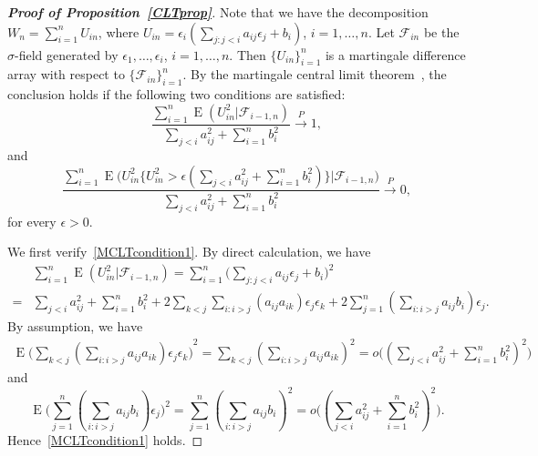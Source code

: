 \documentclass[3p]{elsarticle}
\DeclareMathOperator{\myE}{E}
\theoremstyle{plain}
\theoremstyle{definition}
\theoremstyle{remark}
\begin{document}
 \begin{proof}[\textbf{Proof of Proposition~\ref{CLTprop}}]
     Note that we have the decomposition $W_n=\sum_{i=1}^n U_{in}$, where $U_{in} =\epsilon_i (\sum_{j:j<i} a_{ij}\epsilon_j+b_i )$, $i=1,\ldots,n$.
    Let $\mathcal{F}_{in}$ be the $\sigma$-field generated by $\epsilon_1,\ldots,\epsilon_i$, $i=1,\ldots, n$.
     Then $\{U_{in}\}_{i=1}^n$ is a martingale difference array with respect to $\{\mathcal{F}_{in}\}_{i=1}^n$. 
     By the martingale central limit theorem~\citep[Theorem 1 of Chapter VIII ]{pollard1984convergence}, the conclusion holds if the following two conditions are satisfied:
     \begin{equation}\label{MCLTcondition1}
         \frac{\sum_{i=1}^n \myE(U_{in}^2 |\mathcal{F}_{i-1,n})}{\sum_{j<i} a_{ij}^2+\sum_{i=1}^n b_i^2}\xrightarrow{P} 1,
     \end{equation}
     and
     \begin{equation}\label{MCLTcondition2}
         \frac{\sum_{i=1}^n \myE\big(U_{in}^2\big\{U_{in}^2>\epsilon (\sum_{j<i} a_{ij}^2+\sum_{i=1}^n b_i^2)\big\}\big|\mathcal{F}_{i-1,n}\big)}{\sum_{ j<i} a_{ij}^2+\sum_{i=1}^n b_i^2}\xrightarrow{P} 0,
     \end{equation}
     for every $\epsilon>0$.

     We first verify~\eqref{MCLTcondition1}.
By direct calculation, we have
     \begin{equation*}
         \begin{aligned}
             &\sum_{i=1}^n \myE(U_{in}^2 |\mathcal{F}_{i-1,n})
             =\sum_{i=1}^n \big(\sum_{j:j<i}a_{ij}\epsilon_j +b_i \big)^2\\
             =&\sum_{j<i} a_{ij}^2+\sum_{i=1}^n b_i^2 +2\sum_{k<j} \sum_{i:i>j}(a_{ij}a_{ik})\epsilon_j \epsilon_k+2\sum_{j=1}^n (\sum_{i:i>j} a_{ij}b_i) \epsilon_j.
         \end{aligned}
     \end{equation*}
     By assumption, we have
     \begin{equation*}
         \begin{aligned}
             \myE{\big(\sum_{k<j} (\sum_{i:i>j}a_{ij}a_{ik})\epsilon_j \epsilon_k \big)}^2
             =
             \sum_{k<j} (\sum_{i:i>j}a_{ij}a_{ik})^2
             =
             o\big((\sum_{j<i} a_{ij}^2 +\sum_{i=1}^n b_i^2)^2\big)
         \end{aligned}
     \end{equation*}
     and
     $$
     \myE \big(\sum_{j=1}^n (\sum_{i:i>j} a_{ij}b_i) \epsilon_j\big)^2
     =
     \sum_{j=1}^n (\sum_{i:i>j} a_{ij}b_i)^2 
             =
             o\big((\sum_{j<i} a_{ij}^2 +\sum_{i=1}^n b_i^2)^2\big).
     $$
     Hence~\eqref{MCLTcondition1} holds.


\end{proof}
\end{document}
